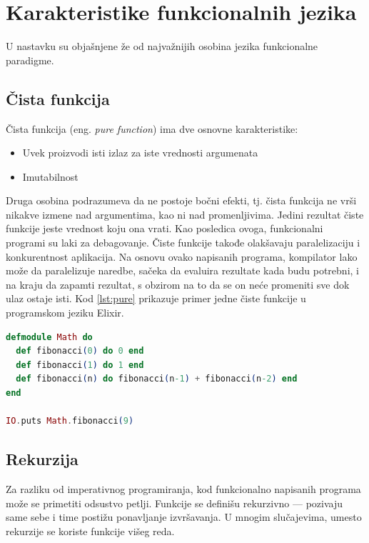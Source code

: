 \documentclass[12pt,oneside]{memoir}
\begin{document}
\section{Karakteristike funkcionalnih jezika}
U nastavku su objašnjene že od najvažnijih osobina jezika funkcionalne paradigme. 

\subsection{Čista funkcija}
Čista funkcija (eng. \textit{pure function}) ima dve osnovne karakteristike: 
\begin{itemize}
\item Uvek proizvodi isti izlaz za iste vrednosti argumenata
\item Imutabilnost 
\end{itemize}
\par
Druga osobina podrazumeva da ne postoje bočni efekti, tj. čista funkcija ne vrši nikakve izmene nad argumentima, kao ni nad promenljivima. Jedini rezultat čiste funkcije jeste vrednost koju ona vrati. Kao posledica ovoga, funkcionalni programi su laki za debagovanje. Čiste funkcije takođe olakšavaju paralelizaciju i konkurentnost aplikacija. Na osnovu ovako napisanih programa, kompilator lako može da paralelizuje naredbe, sačeka da evaluira rezultate kada budu potrebni, i na kraju da zapamti rezultat, s obzirom na to da se on neće promeniti sve dok ulaz ostaje isti. Kod \ref{lst:pure} prikazuje primer jedne čiste funkcije u programskom jeziku Elixir. 

\begin{lstlisting}[language=elixir, caption={Primer čiste funkcije},captionpos=b, label={lst:pure}]
defmodule Math do 
  def fibonacci(0) do 0 end
  def fibonacci(1) do 1 end
  def fibonacci(n) do fibonacci(n-1) + fibonacci(n-2) end
end

IO.puts Math.fibonacci(9)
\end{lstlisting}

\subsection{Rekurzija}
Za razliku od imperativnog programiranja, kod funkcionalno napisanih programa može se primetiti odsustvo petlji. Funkcije se definišu rekurzivno --- pozivaju same sebe i time postižu ponavljanje izvršavanja. U mnogim slučajevima, umesto rekurzije se koriste funkcije višeg reda.
\end{document}
